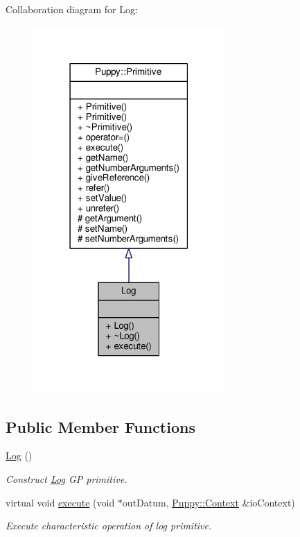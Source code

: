 Collaboration diagram for Log\+:
\nopagebreak
\begin{figure}[H]
\begin{center}
\leavevmode
\includegraphics[width=207pt]{classLog__coll__graph}
\end{center}
\end{figure}
\subsection*{Public Member Functions}
\begin{DoxyCompactItemize}
\item 
\hypertarget{classLog_af6071a60aa52b6c1b511f99b4bc1b8fe}{}\hyperlink{classLog_af6071a60aa52b6c1b511f99b4bc1b8fe}{Log} ()\label{classLog_af6071a60aa52b6c1b511f99b4bc1b8fe}

\begin{DoxyCompactList}\small\item\em Construct \hyperlink{classLog}{Log} G\+P primitive. \end{DoxyCompactList}\item 
virtual void \hyperlink{classLog_a0f034cdf9ef168f4ee556e24934519ab}{execute} (void $\ast$out\+Datum, \hyperlink{classPuppy_1_1Context}{Puppy\+::\+Context} \&io\+Context)
\begin{DoxyCompactList}\small\item\em Execute characteristic operation of log primitive. \end{DoxyCompactList}\end{DoxyCompactItemize}
